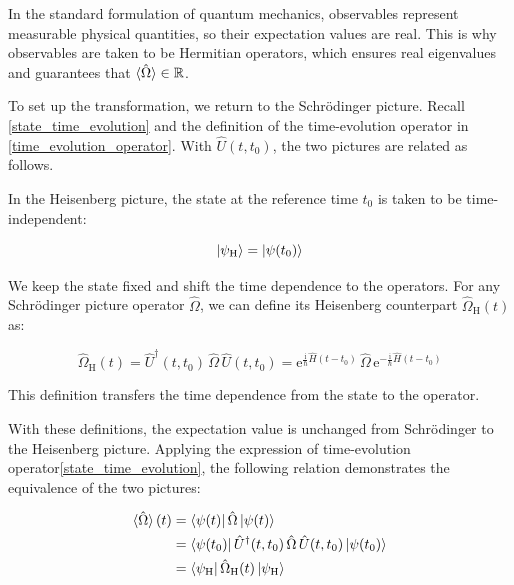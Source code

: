 In the standard formulation of quantum mechanics, observables represent measurable physical quantities, so their expectation values are real.
This is why observables are taken to be Hermitian operators, which ensures real eigenvalues and guarantees that $\braket{\hat{\Omega}}\in\mathbb{R}$.

To set up the transformation, we return to the Schrödinger picture.
Recall \eqref{state_time_evolution} and the definition of the time-evolution operator in \eqref{time_evolution_operator}.
With $\hat{U}(t,t_0)$, the two pictures are related as follows.

In the Heisenberg picture, the state at the reference time $t_0$ is taken to be time-independent:

\begin{equation}
    \ket{\psi_\mathrm{H}}=\ket{\psi(t_0)}
\label{heisenberg_state_definition}
\end{equation}

We keep the state fixed and shift the time dependence to the operators.
For any Schrödinger picture operator $\hat{\Omega}$, we can define its Heisenberg counterpart $\hat{\Omega}_\mathrm{H}(t)$ as:

\begin{equation}
    \hat\Omega_\mathrm{H}(t)
    =\hat{U}^\dagger(t,t_0)\,\hat{\Omega}\,\hat{U}(t,t_0)
    =\mathrm{e}^{\frac{\mathrm{i}}{\hbar}\hat{H}(t-t_0)}\,\hat{\Omega}\,\mathrm{e}^{-\frac{\mathrm{i}}{\hbar}\hat{H}(t-t_0)}
\label{heisenberg_operator_definition}
\end{equation}

This definition transfers the time dependence from the state to the operator.

With these definitions, the expectation value is unchanged from Schrödinger to the Heisenberg picture.
Applying the expression of time-evolution operator\eqref{state_time_evolution},
the following relation demonstrates the equivalence of the two pictures:

\begin{equation}
\begin{aligned}
    \braket{\hat{\Omega}}(t)&=\bra{\psi(t)}\hat{\Omega}\ket{\psi(t)}\\
    &=\bra{\psi(t_0)}\hat{U}^\dagger(t,t_0)\,\hat{\Omega}\,\hat{U}(t,t_0)\ket{\psi(t_0)} \\
    &=\bra{\psi_\mathrm{H}}\hat{\Omega}_\mathrm{H}(t)\ket{\psi_\mathrm{H}}
\end{aligned}
\label{equivalence_schrodinger_heisenberg}
\end{equation}

